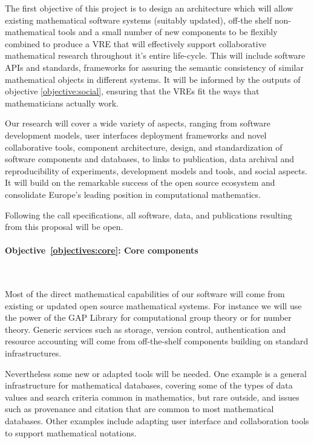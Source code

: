 \documentclass[noworkareas,deliverables,gitinfo,compactht]{euproposal}
\begin{document}
\begin{proposal}
The first objective of this project is to design an architecture which
will allow existing mathematical software systems (suitably updated), 
off-the shelf non-mathematical tools and a small number of new
components to be flexibly combined to produce a VRE that will
effectively support collaborative mathematical research throughout
it's entire life-cycle. This will include software APIs and standards,
frameworks for assuring the semantic consistency of similar
mathematical objects in different systems.  It will be informed by the
outputs of objective \ref{objective:social}, ensuring that the VREs
fit the ways that mathematicians actually work.


Our research will cover a wide variety of aspects, ranging from
software development models, user interfaces   deployment frameworks and novel collaborative tools,
component architecture, design, and standardization of software
components and databases, to links to publication, data archival and
reproducibility of experiments, development models and tools, and
social aspects. It will build on the remarkable success of the open
source ecosystem and consolidate Europe's leading position in
computational mathematics.

Following the call specifications, all software, data, and
publications resulting from this proposal will be open.



\paragraph{Objective~\ref{objectives:core}: Core components}\

Most of the direct mathematical capabilities of our software will come
from existing or updated open source mathematical systems. For instance we will
use the power of the GAP Library for computational group theory or
\PariGP for number theory. Generic services such as storage, version
control, authentication and resource accounting will come from
off-the-shelf components building on standard infrastructures. 

Nevertheless some new or adapted tools will be needed. One example is
a general infrastructure for mathematical databases, covering some of
the types of data values and search criteria common in mathematics,
but rare outside, and issues such as provenance and citation that are
common to most mathematical databases. Other examples include adapting
user interface and collaboration tools to support mathematical notations.





\end{proposal}
\end{document}

